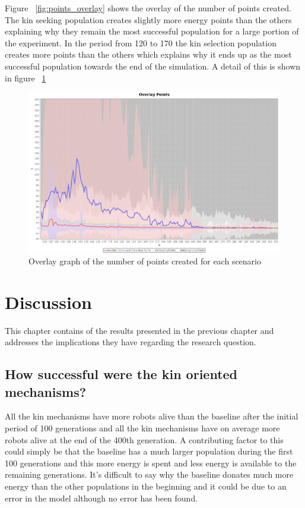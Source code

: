 \documentclass[a4paper]{book}
\begin{document}
Figure ~\ref{fig:points_overlay} shows the overlay of the number of points created. 
The kin seeking population creates slightly more energy points than the others explaining why they remain the most successful population for a large portion of the experiment.
In the period from 120 to 170 the kin selection population creates more points than the others which explains why it ends up as the most successful population towards the end of the simulation. A detail of this is shown in figure ~\ref{fig:detail_points_overlay}

\begin{figure}
\includegraphics[width=\textwidth]{expr2/overlay_points_detail}
\caption{Overlay graph of the number of points created for each scenario}
\label{fig:detail_points_overlay}
\end{figure}
\chapter{Discussion}

This chapter contains of the results presented in the previous chapter and addresses the implications they have regarding the research question.

\section{How successful were the kin oriented mechanisms?}

All the kin mechanisms have more robots alive than the baseline after the initial period of 100 generations and all the kin mechanisms have on average more robots alive at the end of the 400th generation. A contributing factor to this could simply be that the baseline has a much larger population during the first 100 generations and this more energy is spent and less energy is available to the remaining generations. It's difficult to say why the baseline donates much more energy than the other populations in the beginning and it could be due to an error in the model although no error has been found. 
\end{document}

